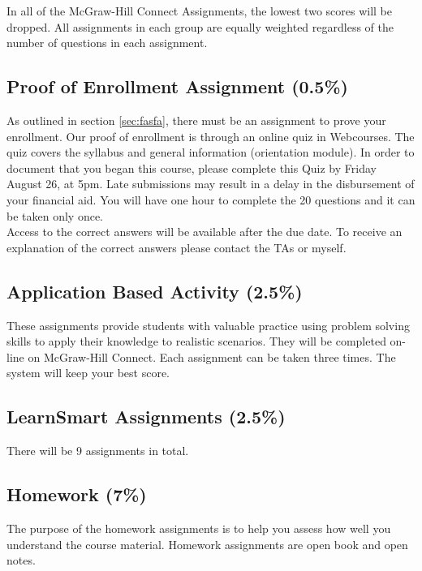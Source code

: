\documentclass[11pt]{paper}
\begin{document}
In all of the McGraw-Hill Connect Assignments, the lowest two scores will be dropped. All assignments in each group are equally weighted regardless of the number of questions in each assignment.

\subsection{Proof of Enrollment Assignment (0.5\%)} \label{sec:fasfaquiz}

As outlined in section \ref{sec:fasfa}, there must be an assignment to prove your enrollment. Our proof of enrollment is through an online quiz in Webcourses. The quiz covers the syllabus and general information (orientation module). In order to document that you began this course, please complete this Quiz by Friday August 26, at 5pm. Late submissions may result in a delay in the disbursement of your financial aid. You will have one hour to complete the 20 questions and it can be taken only once.\\

Access to the correct answers will be available after the due date. To receive an explanation of the correct answers please contact the TAs or myself.

\subsection{Application Based Activity (2.5\%)}

These assignments provide students with valuable practice using problem solving skills to apply their knowledge to realistic scenarios. They will be completed on-line on McGraw-Hill Connect. Each assignment can be taken three times. The system will keep your best score.


\subsection{LearnSmart Assignments (2.5\%)}

There will be 9 assignments in total.

\subsection{Homework (7\%)}

The purpose of the homework assignments is to help you assess how well you understand the course material. Homework assignments are open book and open notes.
\end{document}
